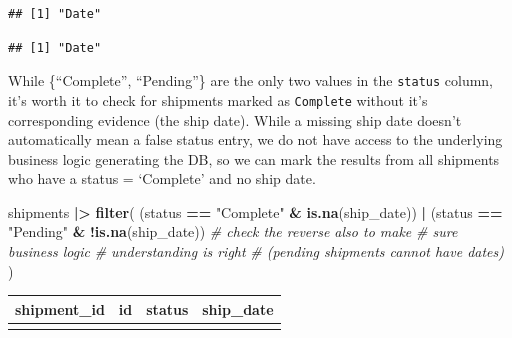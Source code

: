 \documentclass[
]{article}
\newenvironment{Shaded}{\begin{snugshade}}{\end{snugshade}}
\newcommand{\CommentTok}[1]{\textcolor[rgb]{0.56,0.35,0.01}{\textit{#1}}}
\newcommand{\FunctionTok}[1]{\textcolor[rgb]{0.13,0.29,0.53}{\textbf{#1}}}
\newcommand{\NormalTok}[1]{#1}
\newcommand{\SpecialCharTok}[1]{\textcolor[rgb]{0.81,0.36,0.00}{\textbf{#1}}}
\newcommand{\StringTok}[1]{\textcolor[rgb]{0.31,0.60,0.02}{#1}}
\newcounter{none} %
\begin{document}
\begin{Shaded}
\end{Shaded}

\begin{verbatim}
## [1] "Date"
\end{verbatim}

\begin{Shaded}
\end{Shaded}

\begin{verbatim}
## [1] "Date"
\end{verbatim}

While \{``Complete'', ``Pending''\} are the only two values in the
\texttt{status} column, it's worth it to check for shipments marked as
\texttt{Complete} without it's corresponding evidence (the ship date).
While a missing ship date doesn't automatically mean a false status
entry, we do not have access to the underlying business logic generating
the DB, so we can mark the results from all shipments who have a status
= `Complete' and no ship date.

\begin{Shaded}
\begin{Highlighting}[]
\NormalTok{shipments }\SpecialCharTok{|\textgreater{}}
  \FunctionTok{filter}\NormalTok{(}
\NormalTok{    (status }\SpecialCharTok{==} \StringTok{"Complete"} \SpecialCharTok{\&} \FunctionTok{is.na}\NormalTok{(ship\_date)) }\SpecialCharTok{|}
\NormalTok{      (status }\SpecialCharTok{==} \StringTok{"Pending"} \SpecialCharTok{\&} \SpecialCharTok{!}\FunctionTok{is.na}\NormalTok{(ship\_date)) }\CommentTok{\# check the reverse also to make}
    \CommentTok{\#                                             sure business logic }
    \CommentTok{\#                                              understanding is right}
    \CommentTok{\#                                 (pending shipments cannot have dates)}
\NormalTok{  ) }
\end{Highlighting}
\end{Shaded}

{\def\LTcaptype{none} %
\begin{longtable}[]{@{}rrll@{}}
\toprule\noalign{}
shipment\_id & id & status & ship\_date \\
\midrule\noalign{}
\endhead
\bottomrule\noalign{}
\endlastfoot
\end{longtable}
}
\end{document}
